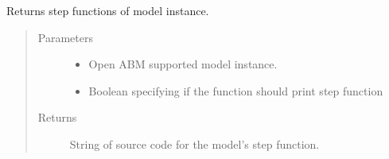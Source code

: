 \documentclass[letterpaper,10pt,english]{sphinxmanual}
\begin{document}

\begin{fulllineitems}
\label{\detokenize{index:oabm_tools.get_model_step}}
Returns step functions of model instance.
\begin{quote}\begin{description}
\item[{Parameters}] \leavevmode\begin{itemize}
\item {} 
 \textendash{} Open ABM supported model instance.

\item {} 
 \textendash{} Boolean specifying if the function should print step function

\end{itemize}

\item[{Returns}] \leavevmode
String of source code for the model’s step function.

\end{description}\end{quote}

\end{fulllineitems}

\end{document}
